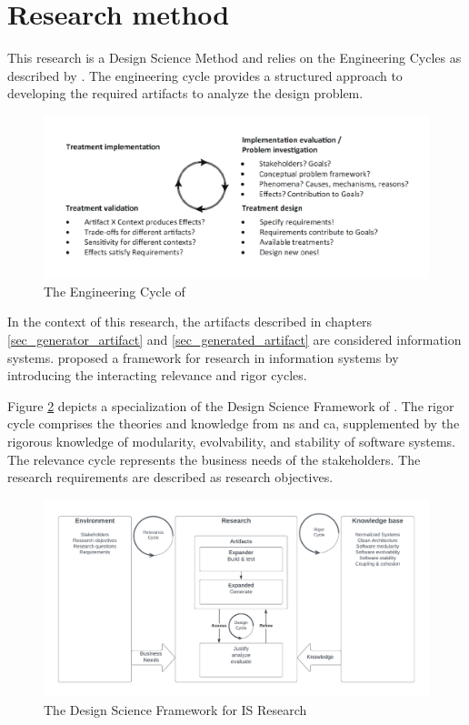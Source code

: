 \section{Research method} \label{sec_research_method}

This research is a Design Science Method and relies on the Engineering Cycles as described
by \textcite{wieringa_design_2014}. The engineering cycle provides a structured approach
to developing the required artifacts to analyze the design problem.

\begin{figure}[H]
    \centering
    \includegraphics[width=1\textwidth]{figures/engineering_cycle.pdf}
    \caption[Engineering cycle]{The Engineering Cycle of \textcite{wieringa_design_2014}}
    \label{fig_engineering_cycle}
\end{figure}

In the context of this research, the artifacts described in chapters
\ref{sec_generator_artifact} and \ref{sec_generated_artifact} are considered information
systems. \citeauthor{hevner_design_2004} proposed a framework for research in information
systems by introducing the interacting relevance and rigor cycles.

Figure \ref{fig_dsr} depicts a specialization of the Design Science Framework of
\textcite{hevner_design_2004}. The rigor cycle comprises the theories and knowledge from
\gls{ns} and \gls{ca}, supplemented by the rigorous knowledge of modularity, evolvability,
and stability of software systems. The relevance cycle represents the business needs of
the stakeholders. The research requirements are described as research objectives.

\begin{figure}[H]
    \centering
    \includegraphics[width=1\textwidth]{figures/rigor_relevance_cycle.pdf}
    \caption[Design Science Framework for IS Research]{The Design Science Framework for IS Research}
    \label{fig_dsr}
\end{figure}